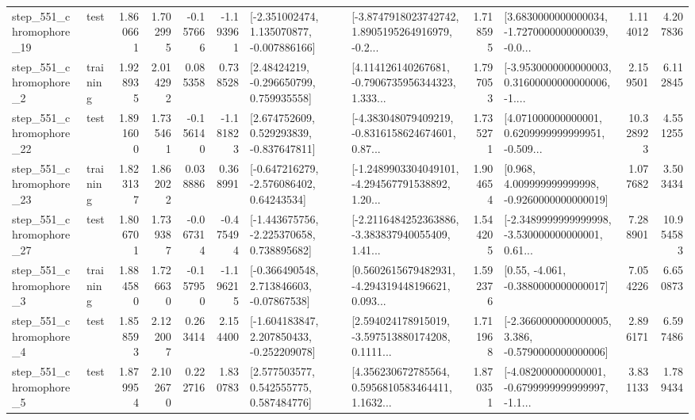 \begin{tabular}{llrrrrllrlrr}
  step\_551\_chromophore\_19 &      test &      1.860661 &    1.702995 &     -0.157666 & -1.193961 &   [-2.351002474, 1.135070877, -0.007886166] &  [-3.8747918023742742, 1.8905195264916979, -0.2... &       1.718595 &  [3.6830000000000034, -1.7270000000000039, -0.0... &            1.114012 &          4.207836 \\
   step\_551\_chromophore\_2 &  training &      1.928935 &    2.014292 &      0.085358 &  0.738528 &     [2.48424219, -0.296650799, 0.759935558] &  [4.114126140267681, -0.7906735956344323, 1.333... &       1.797053 &  [-3.9530000000000003, 0.31600000000000006, -1.... &            2.159501 &          6.112845 \\
  step\_551\_chromophore\_22 &      test &      1.891600 &    1.735461 &     -0.156140 & -1.181823 &    [2.674752609, 0.529293839, -0.837647811] &  [-4.383048079409219, -0.8316158624674601, 0.87... &       1.735271 &  [4.071000000000001, 0.6209999999999951, -0.509... &           10.328923 &          4.551255 \\
  step\_551\_chromophore\_23 &  training &      1.823137 &    1.862022 &      0.038886 &  0.368991 &    [-0.647216279, -2.576086402, 0.64243534] &  [-1.2489903304049101, -4.294567791538892, 1.20... &       1.904654 &    [0.968, 4.009999999999998, -0.9260000000000019] &            1.077682 &          3.503434 \\
  step\_551\_chromophore\_27 &      test &      1.806701 &    1.739387 &     -0.067314 & -0.475494 &   [-1.443675756, -2.225370658, 0.738895682] &  [-2.2116484252363886, -3.383837940055409, 1.41... &       1.544205 &  [-2.3489999999999998, -3.530000000000001, 0.61... &            7.288901 &         10.954583 \\
   step\_551\_chromophore\_3 &  training &      1.884580 &    1.726630 &     -0.157950 & -1.196215 &    [-0.366490548, 2.713846603, -0.07867538] &  [0.5602615679482931, -4.294319448196621, 0.093... &       1.592376 &                [0.55, -4.061, -0.3880000000000017] &            7.054226 &          6.650873 \\
   step\_551\_chromophore\_4 &      test &      1.858593 &    2.122007 &      0.263414 &  2.154400 &   [-1.604183847, 2.207850433, -0.252209078] &  [2.594024178915019, -3.597513880174208, 0.1111... &       1.711968 &  [-2.3660000000000005, 3.386, -0.5790000000000006] &            2.896171 &          6.597486 \\
   step\_551\_chromophore\_5 &      test &      1.879954 &    2.102670 &      0.222716 &  1.830783 &     [2.577503577, 0.542555775, 0.587484776] &  [4.356230672785564, 0.5956810583464411, 1.1632... &       1.870351 &  [-4.082000000000001, -0.6799999999999997, -1.1... &            3.831133 &          1.789434 \\

\end{tabular}
